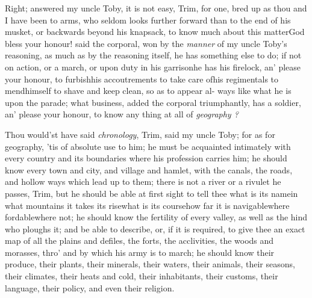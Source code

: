\documentclass{article}
\begin{document}
Right; answered my uncle Toby, it is not easy,
Trim, for one, bred up as thou and I have been to arms, who
seldom looks further forward than to the end of his
musket, or backwards beyond his knapsack, to know much about this
matter\tsh God bless your honour! said the corporal, won
by the \textit{manner} of my uncle Toby’s reasoning, as much as
by the reasoning itself, he has something else to do; if not on
action, or a march, or upon duty in his garrison\tsk he has his
firelock, an’ please your honour, to furbish\tsk his
accoutrements to take care of\tsk his regimentals to
mend\tsk himself to shave and keep clean, so as to appear al- ways
like what he is upon the parade; what business, added the corporal
triumphantly, has a soldier, an’ please your honour, to know
any thing at all of \textit{geography ?}

\tsh Thou would’st have said \textit{chro\-no\-logy},
Trim, said my uncle Toby; for as for geography,
’tis of absolute use to him; he must be acquainted intimately
with every country and its boundaries where his profession carries
him; he should know every town and city, and village and hamlet,
with the canals, the roads, and hollow ways which lead up to them; there
is not a river or a rivulet he passes, Trim, but he should
be able at first sight to tell thee what is its name\tsk in what
mountains it takes its rise\tsk what is its course\tsk how far
it is navigable\tsk where fordable\tsk where not; he should
know the fertility of every valley, as well as the hind who ploughs
it; and be able to describe, or, if it is required, to give thee an
exact map of all the plains and defiles, the forts, the
acclivities, the woods and morasses, thro’ and by which his
army is to march; he should know their produce, their plants, their
minerals, their waters, their animals, their seasons, their
climates, their heats and cold, their inhabitants, their customs,
their language, their policy, and even their religion.
\end{document}
